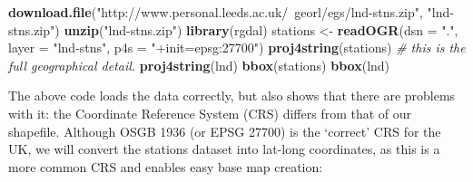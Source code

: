 \documentclass[]{article}
\newenvironment{Shaded}{}{}
\newcommand{\KeywordTok}[1]{\textcolor[rgb]{0.00,0.44,0.13}{\textbf{{#1}}}}
\newcommand{\DataTypeTok}[1]{\textcolor[rgb]{0.56,0.13,0.00}{{#1}}}
\newcommand{\StringTok}[1]{\textcolor[rgb]{0.25,0.44,0.63}{{#1}}}
\newcommand{\CommentTok}[1]{\textcolor[rgb]{0.38,0.63,0.69}{\textit{{#1}}}}
\newcommand{\NormalTok}[1]{{#1}}
\begin{document}
\begin{Shaded}
\begin{Highlighting}[]
\KeywordTok{download.file}\NormalTok{(}\StringTok{"http://www.personal.leeds.ac.uk/~georl/egs/lnd-stns.zip"}\NormalTok{, }\StringTok{"lnd-stns.zip"}\NormalTok{)}
\KeywordTok{unzip}\NormalTok{(}\StringTok{"lnd-stns.zip"}\NormalTok{)}
\KeywordTok{library}\NormalTok{(rgdal)}
\NormalTok{stations <- }\KeywordTok{readOGR}\NormalTok{(}\DataTypeTok{dsn =} \StringTok{"."}\NormalTok{, }\DataTypeTok{layer =} \StringTok{"lnd-stns"}\NormalTok{, }\DataTypeTok{p4s =} \StringTok{"+init=epsg:27700"}\NormalTok{)}
\KeywordTok{proj4string}\NormalTok{(stations)  }\CommentTok{# this is the full geographical detail.}
\KeywordTok{proj4string}\NormalTok{(lnd)}
\KeywordTok{bbox}\NormalTok{(stations)}
\KeywordTok{bbox}\NormalTok{(lnd)}
\end{Highlighting}
\end{Shaded}
The above code loads the data correctly, but also shows that there are
problems with it: the Coordinate Reference System (CRS) differs from
that of our shapefile. Although OSGB 1936 (or EPSG 27700) is the
`correct' CRS for the UK, we will convert the stations dataset into
lat-long coordinates, as this is a more common CRS and enables easy base
map creation:
\end{document}
